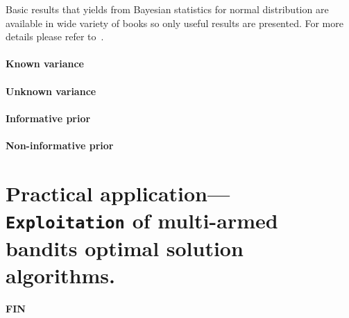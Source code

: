 \documentclass[12pt, a4paper, pdflatex]{report}
\begin{document}
Basic results that yields from Bayesian statistics for normal distribution are available in wide variety of books so only useful results are presented. For more details please refer to~\cite{gelman2003bayesian}\cite{lynch2007introduction}.

\subsubsection{Known variance} 
\subsubsection{Unknown variance}

\subsubsection{Informative prior}
\subsubsection{Non-informative prior}









\chapter{Practical application--- \texttt{\textbf{Exploitation}} of multi-armed bandits optimal solution algorithms.}




\newpage
\begin{center} \textbf{\huge \vspace*{15pt} FIN~\cite{berry+firstedt}} \end{center}

{}

\end{document}
